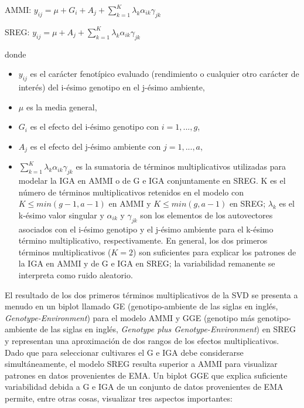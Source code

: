 \hspace{0.5cm} AMMI: $y_{ij}= \mu + G_i + A_j + \sum_{k=1}^K \lambda_k \alpha_{ik} \gamma_{jk}$

\hspace{0.5cm} SREG: $y_{ij}= \mu + A_j + \sum_{k=1}^K \lambda_k \alpha_{ik} \gamma_{jk}$ 

donde 
\begin{itemize}
\item $y_{ij}$ es el carácter fenotípico evaluado (rendimiento o cualquier otro carácter de interés) del i-ésimo genotipo en el j-ésimo ambiente,
\item $\mu$ es la media general,
\item  $G_i$ es el efecto del i-ésimo genotipo con $i=1,...,g$,
\item $A_j$ es el efecto del j-ésimo ambiente con $j=1,...,a$,
\item $\sum_{k=1}^K \lambda_k \alpha_{ik} \gamma_{jk}$ es la sumatoria de términos multiplicativos utilizadas para modelar la IGA en AMMI o de G e IGA conjuntamente en SREG. K es el número de términos multiplicativos retenidos en el modelo con $K \leq min(g-1,a-1)$ en AMMI y $K \leq min(g,a-1)$ en SREG; $\lambda_k$ es el k-ésimo valor singular y $\alpha_{ik}$ y $\gamma_{jk}$ son los elementos de los autovectores asociados con el i-ésimo genotipo y el j-ésimo ambiente para el k-ésimo término multiplicativo, respectivamente. En general, los dos primeros términos multiplicativos ($K=2$) son suficientes para explicar los patrones de la IGA en AMMI y de G e IGA en SREG; la variabilidad remanente se interpreta como ruido aleatorio. 
\end{itemize}


El resultado de los dos primeros términos multiplicativos de la SVD se presenta a menudo en un biplot llamado GE (genotipo-ambiente de las siglas en inglés, \emph{Genotype-Environment}) para el modelo AMMI \citep{Zobel1988} y GGE (genotipo más genotipo-ambiente de las siglas en inglés, \emph{Genotype plus Genotype-Environment}) en SREG \citep{Yanetal2000} y representan una aproximación de dos rangos de los efectos multiplicativos. Dado que para seleccionar cultivares el G e IGA debe considerarse simultáneamente, el modelo SREG resulta superior a AMMI para visualizar patrones en datos provenientes de EMA. Un biplot GGE que explica suficiente variabilidad debida a G e IGA de un conjunto de datos provenientes de EMA permite, entre otras cosas, visualizar tres aspectos importantes: 


